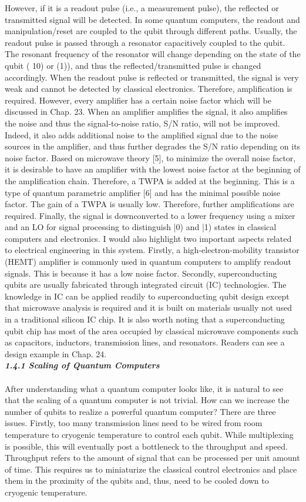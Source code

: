 \documentclass{article}
\newcommand{\bfit}[1]{\textit{\textbf{#1}}}
\begin{document}
However, if it is a readout pulse (i.e., a measurement pulse), the reflected or transmitted signal will be detected. In some quantum computers, the readout and manipulation/reset are coupled to the qubit through different paths. Usually, the readout pulse is passed through a resonator capacitively coupled to the qubit. The resonant frequency of the resonator will change depending on the state of the qubit ( 10) or (1)), and thus the reflected/transmitted pulse is changed accordingly.
When the readout pulse is reflected or transmitted, the signal is very weak and cannot be detected by classical electronics. Therefore, amplification is required.
However, every amplifier has a certain noise factor which will be discussed in Chap. 23. When an amplifier amplifies the signal, it also amplifies the noise and thus the signal-to-noise ratio, S/N ratio, will not be improved. Indeed, it also adds additional noise to the amplified signal due to the noise sources in the amplifier, and thus further degrades the S/N ratio depending on its noise factor. Based on microwave theory [5], to minimize the overall noise factor, it is desirable to have an amplifier with the lowest noise factor at the beginning of the amplification chain. Therefore, a TWPA is added at the beginning. This is a type of quantum parametric amplifier [6] and has the minimal possible noise factor. The gain of a TWPA is usually low. Therefore, further amplifications are required. Finally, the signal is downconverted to a lower frequency using a mixer and an LO for signal processing to distinguish |0) and |1) states in classical computers and electronics.
I would also highlight two important aspects related to electrical engineering in this system. Firstly, a high-electron-mobility transistor (HEMT) amplifier is commonly used in quantum computers to amplify readout signals. This is because it has a low noise factor. Secondly, superconducting qubits are usually fabricated through integrated circuit (IC) technologies. The knowledge in IC can be applied readily to superconducting qubit design except that microwave analysis is required and it is built on materials usually not used in a traditional silicon IC chip. It is also worth noting that a superconducting qubit chip has most of the area occupied by classical microwave components such as capacitors, inductors, transmission lines, and resonators. Readers can see a design example in Chap. 24.
\\[20pt]
\bfit{\large 1.4.1 Scaling of Quantum Computers}
\\\\
After understanding what a quantum computer looks like, it is natural to see that the scaling of a quantum computer is not trivial. How can we increase the number of qubits to realize a powerful quantum computer? There are three issues.
Firstly, too many transmission lines need to be wired from room temperature to cryogenic temperature to control each qubit. While multiplexing is possible, this will eventually post a bottleneck to the throughput and speed. Throughput refers to the amount of signal that can be processed per unit amount of time. This requires us to miniaturize the classical control electronics and place them in the proximity of the qubits and, thus, need to be cooled down to cryogenic temperature.
\end{document}

